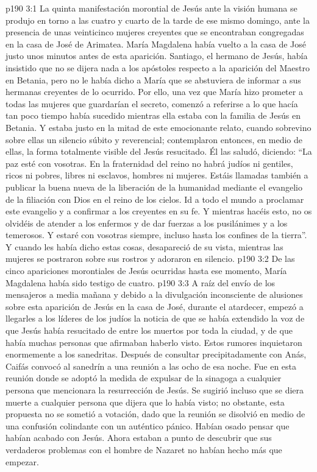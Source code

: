 \vs p190 3:1 La quinta manifestación morontial de Jesús ante la visión humana se produjo en torno a las cuatro y cuarto de la tarde de ese mismo domingo, ante la presencia de unas veinticinco mujeres creyentes que se encontraban congregadas en la casa de José de Arimatea. María Magdalena había vuelto a la casa de José justo unos minutos antes de esta aparición. Santiago, el hermano de Jesús, había insistido que no se dijera nada a los apóstoles respecto a la aparición del Maestro en Betania, pero no le había dicho a María que se abstuviera de informar a sus hermanas creyentes de lo ocurrido. Por ello, una vez que María hizo prometer a todas las mujeres que guardarían el secreto, comenzó a referirse a lo que hacía tan poco tiempo había sucedido mientras ella estaba con la familia de Jesús en Betania. Y estaba justo en la mitad de este emocionante relato, cuando sobrevino sobre ellas un silencio súbito y reverencial; contemplaron entonces, en medio de ellas, la forma totalmente visible del Jesús resucitado. Él las saludó, diciendo: “La paz esté con vosotras. En la fraternidad del reino no habrá judíos ni gentiles, ricos ni pobres, libres ni esclavos, hombres ni mujeres. Estáis llamadas también a publicar la buena nueva de la liberación de la humanidad mediante el evangelio de la filiación con Dios en el reino de los cielos. Id a todo el mundo a proclamar este evangelio y a confirmar a los creyentes en su fe. Y mientras hacéis esto, no os olvidéis de atender a los enfermos y de dar fuerzas a los pusilánimes y a los temerosos. Y estaré con vosotras siempre, incluso hasta los confines de la tierra”. Y cuando les había dicho estas cosas, desapareció de su vista, mientras las mujeres se postraron sobre sus rostros y adoraron en silencio.
\vs p190 3:2 \pc De las cinco apariciones morontiales de Jesús ocurridas hasta ese momento, María Magdalena había sido testigo de cuatro.
\vs p190 3:3 \pc A raíz del envío de los mensajeros a media mañana y debido a la divulgación inconsciente de alusiones sobre esta aparición de Jesús en la casa de José, durante el atardecer, empezó a llegarles a los líderes de los judíos la noticia de que se había extendido la voz de que Jesús había resucitado de entre los muertos por toda la ciudad, y de que había muchas personas que afirmaban haberlo visto. Estos rumores inquietaron enormemente a los sanedritas. Después de consultar precipitadamente con Anás, Caifás convocó al sanedrín a una reunión a las ocho de esa noche. Fue en esta reunión donde se adoptó la medida de expulsar de la sinagoga a cualquier persona que mencionara la resurrección de Jesús. Se sugirió incluso que se diera muerte a cualquier persona que dijera que lo había visto; no obstante, esta propuesta no se sometió a votación, dado que la reunión se disolvió en medio de una confusión colindante con un auténtico pánico. Habían osado pensar que habían acabado con Jesús. Ahora estaban a punto de descubrir que sus verdaderos problemas con el hombre de Nazaret no habían hecho más que empezar.

